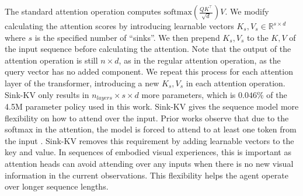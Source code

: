 \documentclass{article}
\newcommand{\sinkv}{Sink-KV\xspace}
\begin{document}
The standard attention operation computes $ \text{softmax}\left( \frac{Q K^\top}{\sqrt{d}} \right) V $.
We modify calculating the attention scores by introducing learnable vectors $ K_s, V_s \in \mathbb{R}^{s \times d} $ where $ s$ is the specified number of ``sinks''.
We then prepend $ K_s, V_s$ to the $K, V$ of the input sequence before calculating the attention.
Note that the output of the attention operation is still $ n \times d$, as in the regular attention operation, as the query vector has no added component.
We repeat this process for each attention layer of the transformer, introducing a new $ K_s, V_s$ in each attention operation.
\sinkv only results in $n_{layers} \times s \times d$ more parameters, which is $0.046\%$ of the 4.5M parameter policy used in this work.
\sinkv gives the sequence model more flexibility on how to attend over the input.
Prior works observe that due to the softmax in the attention, the model is forced to attend to at least one token from the input \citep{off_by_one_softmax,xiao2023efficient}.
\sinkv removes this requirement by adding learnable vectors to the key and value.
In sequences of embodied visual experiences, this is important as attention heads can avoid attending over any inputs when there is no new visual information in the current observations.
This flexibility helps the agent operate over longer sequence lengths.
\end{document}
